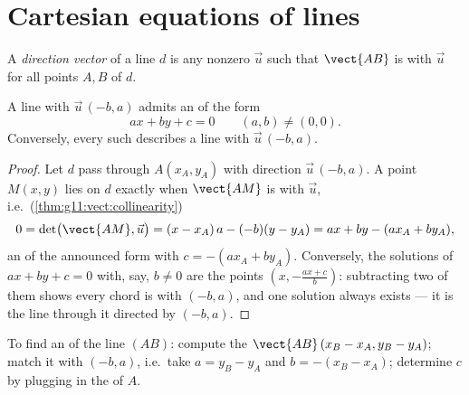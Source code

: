 \section{Cartesian equations of lines}

\begin{definition}\label{def:g11:vect:direction}
A \emph{direction vector} of a line $d$ is any
nonzero  $\vec u$ such that $\vect{AB}$ is  with $\vec u$
for all points $A, B$ of $d$.
\end{definition}

\begin{theorem}\label{thm:g11:vect:cartesian}
A line with  $\vec u\,(-b, a)$ admits an  of the
form
\[
ax + by + c = 0
\qquad (a, b) \neq (0, 0).
\]
Conversely, every such  describes a line with 
$\vec u\,(-b, a)$.
\end{theorem}

\begin{proof}
Let $d$ pass through $A(x_A, y_A)$ with direction $\vec u\,(-b, a)$. A
point $M(x, y)$ lies on $d$ exactly when $\vect{AM}$ is  with
$\vec u$, i.e.\ (\cref{thm:g11:vect:collinearity})
\[
0 = \det\bigl(\vect{AM}, \vec u\bigr)
= (x - x_A)\,a - (-b)(y - y_A)
= ax + by - (a x_A + b y_A),
\]
an  of the announced form with $c = -(a x_A + b y_A)$.
Conversely, the solutions of $ax + by + c = 0$ with, say, $b \neq 0$ are
the points $\left(x, -\frac{a x + c}{b}\right)$: subtracting two of them
shows every chord is  with $(-b, a)$, and one solution always
exists --- it is the line through it directed by $(-b, a)$.
\end{proof}

\begin{method}\label{met:g11:vect:twopoints}
To find an  of the line $(AB)$: compute the 
$\vect{AB}\,(x_B - x_A, y_B - y_A)$; match it with $(-b, a)$, i.e.\ take
$a = y_B - y_A$ and $b = -(x_B - x_A)$; determine $c$ by plugging in the
 of $A$.
\end{method}

